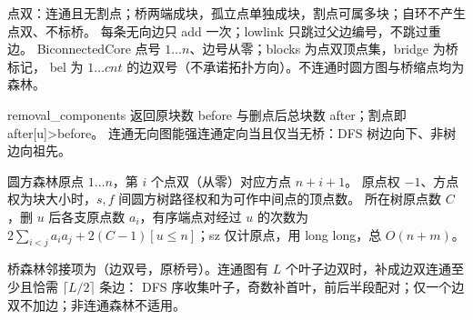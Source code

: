 点双：连通且无割点；桥两端成块，孤立点单独成块，割点可属多块；自环不产生点双、不标桥。
每条无向边只 add 一次；lowlink 只跳过父边编号，不跳过重边。
BiconnectedCore 点号 $1\ldots n$、边号从零；blocks 为点双顶点集，bridge 为桥标记，
bel 为 $1\ldots cnt$ 的边双号（不承诺拓扑方向）。不连通时圆方图与桥缩点均为森林。

removal\_components 返回原块数 before 与删点后总块数 after；割点即 after[u]>before。
连通无向图能强连通定向当且仅当无桥：DFS 树边向下、非树边向祖先。

圆方森林原点 $1\ldots n$，第 $i$ 个点双（从零）对应方点 $n+i+1$。
原点权 $-1$、方点权为块大小时，$s,f$ 间圆方树路径权和为可作中间点的顶点数。
所在树原点数 $C$，删 $u$ 后各支原点数 $a_i$，有序端点对经过 $u$ 的次数为
$2\sum_{i<j}a_i a_j+2(C-1)[u\le n]$；sz 仅计原点，用 long long，总 $O(n+m)$。

桥森林邻接项为（边双号，原桥号）。连通图有 $L$ 个叶子边双时，补成边双连通至少且恰需 $\lceil L/2\rceil$ 条边：
DFS 序收集叶子，奇数补首叶，前后半段配对；仅一个边双不加边；非连通森林不适用。
